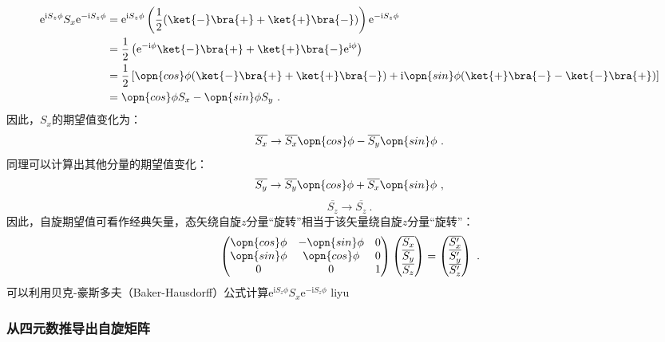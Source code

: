\begin{equation}
\begin{aligned}
\mathrm e^{\mathrm i S_z\phi}S_x\mathrm e^{-\mathrm i S_z\phi}&=\mathrm e^{\mathrm i S_z\phi}\left(\frac{1}{2}(\ket{-}\bra{+}+\ket{+}\bra{-})\right)\mathrm e^{-\mathrm i S_z\phi}\\
 &=\frac{1}{2}\left(\mathrm e^{-\mathrm i \phi}\ket{-}\bra{+}+\ket{+}\bra{-}\mathrm e^{\mathrm i \phi}\right)\\
 &=\frac{1}{2}\left[\opn{cos}\phi(\ket{-}\bra{+}+\ket{+}\bra{-})+\mathrm i\opn{sin}\phi(\ket{+}\bra{-}-\ket{-}\bra{+})\right]\\
 &=\opn{cos}\phi S_x-\opn{sin}\phi S_y~.
\end{aligned}
\end{equation}
因此，$S_x$的期望值变化为：
\begin{equation}
\overline{S_x}\rightarrow  \overline{S_x}\opn{cos}\phi-\overline{S_y}\opn{sin}\phi~.
\end{equation}
同理可以计算出其他分量的期望值变化：
\begin{equation}
\overline{S_y}\rightarrow \overline{S_y}\opn{cos}\phi+\overline{S_x}\opn{sin}\phi~,
\end{equation}
\begin{equation}
\overline{S_z}\rightarrow \overline{S_z}~.
\end{equation}
因此，自旋期望值可看作经典矢量，态矢绕自旋$z$分量“旋转”相当于该矢量绕自旋$z$分量“旋转”：
\begin{equation}
\begin{pmatrix}
 \opn{cos}\phi &-\opn{sin}\phi  &0 \\
  \opn{sin}\phi & \opn{cos}\phi  & 0\\
  0& 0 &1
\end{pmatrix}
\begin{pmatrix}
 \overline{S_x}\\
  \overline{S_y}\\
 \overline{S_z}
\end{pmatrix}
=
\begin{pmatrix}
  \overline{S'_x}\\
  \overline{S'_y}\\
 \overline{S'_z}
\end{pmatrix}~.
\end{equation}
可以利用贝克-豪斯多夫（Baker-Hausdorff）公式计算$\mathrm e^{\mathrm i S_z\phi}S_x\mathrm e^{-\mathrm i S_z\phi}$
liyu
\subsubsection{从四元数推导出自旋矩阵}
